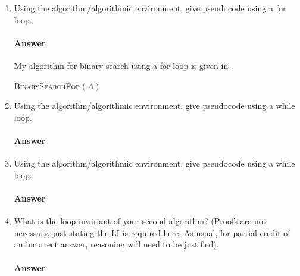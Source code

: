 \documentclass{article}
\begin{document}
\begin{enumerate}
    \item Using the algorithm/algorithmic environment,
        give pseudocode using a for loop.

        \paragraph{Answer} My algorithm for binary search using a for loop is given in .

        \begin{algorithm}
            \caption{\textsc{BinarySearchFor}$(A)$}\label{alg:forloop}
            \begin{algorithmic}
                \State {}
            \end{algorithmic}
        \end{algorithm}

    \item Using the algorithm/algorithmic environment, give pseudocode using a while loop.

        \paragraph{Answer}


    \item Using the algorithm/algorithmic environment, give pseudocode using a while loop.

        \paragraph{Answer}


    \item What is the loop invariant of your second algorithm? (Proofs are not
        necessary, just stating the LI is required here.  As usual, for partial
        credit of an incorrect answer, reasoning will need to be justified).

        \paragraph{Answer}

\end{enumerate}

\collab{\todo{}} 
\end{document}
